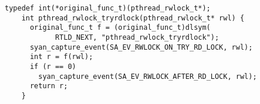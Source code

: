 \begin{lstlisting}[caption=Funcția
                           \lstinline{pthread_rwlock_tryrdlock} din
                           \lstinline{pthread_shim},
                   float, floatplacement=H,
                   label=code:pthread_shim_func]
    typedef int(*original_func_t)(pthread_rwlock_t*);
    int pthread_rwlock_tryrdlock(pthread_rwlock_t* rwl) {
      original_func_t f = (original_func_t)dlsym(
            RTLD_NEXT, "pthread_rwlock_tryrdlock");
      syan_capture_event(SA_EV_RWLOCK_ON_TRY_RD_LOCK, rwl);
      int r = f(rwl);
      if (r == 0)
        syan_capture_event(SA_EV_RWLOCK_AFTER_RD_LOCK, rwl);
      return r;
    }
\end{lstlisting}
